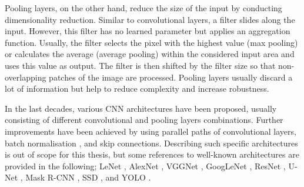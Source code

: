 Pooling layers, on the other hand, reduce the size of the input by conducting dimensionality reduction.
Similar to convolutional layers, a filter slides along the input.
However, this filter has no learned parameter but applies an aggregation function.
Usually, the filter selects the pixel with the highest value (max pooling) or calculates the average (average pooling) within the considered input area and uses this value as output.
The filter is then shifted by the filter size so that non-overlapping patches of the image are processed.
Pooling layers usually discard a lot of information but help to reduce complexity and increase robustness.

In the last decades, various CNN architectures have been proposed, usually consisting of different convolutional and pooling layers combinations.
Further improvements have been achieved by using parallel paths of convolutional layers, batch normalisation , and skip connections.
Describing such specific architectures is out of scope for this thesis, but some references to well-known architectures are provided in the following; LeNet , AlexNet , VGGNet , GoogLeNet , ResNet , U-Net , Mask R-CNN , SSD , and YOLO .








